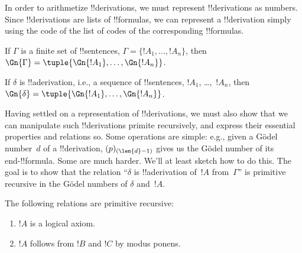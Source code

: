 \documentclass[../../../include/open-logic-section]{subfiles}
\begin{document}

\begin{explain}
In order to arithmetize !!{derivation}s, we must represent
!!{derivation}s as numbers. Since !!{derivation}s are lists of
!!{formula}s, we can represent a !!{derivation} simply using the code
of the list of codes of the corresponding !!{formula}s.
\end{explain}

\begin{defn}
If $\Gamma$ is a finite set of !!{sentence}s, $\Gamma = \{!A_1, \dots,
!A_n\}$, then $\Gn{\Gamma} = \tuple{\Gn{!A_1}, \dots, \Gn{!A_n}}$.

If $\delta$ is !!a{derivation}, i.e., a sequence of !!{sentence}s,
$!A_1$, \dots,~$!A_n$, then $\Gn{\delta} = \tuple{\Gn{!A_1}, \dots,
  \Gn{!A_n}}$.
\end{defn}

\begin{explain}
Having settled on a representation of !!{derivation}s, we must also
show that we can manipulate such !!{derivation}s primite recursively,
and express their essential properties and relations so.  Some
operations are simple: e.g., given a G\"odel number~$d$ of a
!!{derivation}, $(p)_{(\len{d}-1)}$ gives us the G\"odel number of its
end-!!{formula}.  Some are much harder.  We'll at least sketch how to
do this.  The goal is to show that the relation ``$\delta$ is
!!a{derivation} of~$!A$ from~$\Gamma$'' is primitive recursive in the
G\"odel numbers of $\delta$ and~$!A$.
\end{explain}

\begin{prop}
The following relations are primitive recursive:
\begin{enumerate}
\item $!A$ is a logical axiom.
\item $!A$ follows from $!B$ and $!C$ by modus ponens.
\end{enumerate}
\end{prop}
\end{document}
